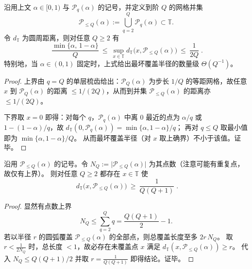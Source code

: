 \begin{proposition}\label{prop:zeta-cyclic-lift-addressable-grid-covering-radius}
沿用上文 \(\alpha\in[0,1)\) 与 \(\mathcal P_q(\alpha)\) 的记号，并定义到阶 \(Q\) 的网格并集
\[
\mathcal P_{\le Q}(\alpha):=\bigcup_{q=2}^{Q}\mathcal P_q(\alpha)\subset\mathbb T .
\]
令 \(d_{\mathbb T}\) 为圆周距离，则对任意 \(Q\ge 2\) 有
\[
\boxed{\;
\frac{\min\{\alpha,\,1-\alpha\}}{Q}
\ \le\
\sup_{x\in\mathbb T} d_{\mathbb T}\bigl(x,\mathcal P_{\le Q}(\alpha)\bigr)
\ \le\
\frac{1}{2Q}\; }.
\]
特别地，当 \(\alpha\in(0,1)\) 固定时，上式给出最坏覆盖半径的数量级 \(\Theta(Q^{-1})\)。
\end{proposition}
\begin{proof}
上界由 \(q=Q\) 的单层梳齿给出：\(\mathcal P_Q(\alpha)\) 为步长 \(1/Q\) 的等距网格，故任意 \(x\) 到 \(\mathcal P_Q(\alpha)\) 的距离 \(\le 1/(2Q)\)，从而到并集 \(\mathcal P_{\le Q}(\alpha)\) 的距离亦 \(\le 1/(2Q)\)。
\par
下界取 \(x=0\) 即得：对每个 \(q\)，\(\mathcal P_q(\alpha)\) 中离 \(0\) 最近的点为 \(\alpha/q\) 或 \(1-(1-\alpha)/q\)，故
\(
d_{\mathbb T}(0,\mathcal P_q(\alpha))=\min\{\alpha,1-\alpha\}/q
\)；
再对 \(q\le Q\) 取最小值即为 \(\min\{\alpha,1-\alpha\}/Q\)。
从而最坏覆盖半径（对 \(x\) 取上确界）不小于该值。证毕。
\end{proof}

\begin{proposition}\label{prop:zeta-cyclic-lift-covering-radius-counting-lb}
沿用 \(\mathcal P_{\le Q}(\alpha)\) 的记号。令
\(
N_Q:=\bigl|\mathcal P_{\le Q}(\alpha)\bigr|
\)
为其点数（注意可能有重复点，故仅有上界）。
则对任意 \(Q\ge 2\) 都存在 \(x\in\mathbb T\) 使
\[
\boxed{\;
d_{\mathbb T}\bigl(x,\mathcal P_{\le Q}(\alpha)\bigr)\ \ge\ \frac{1}{Q(Q+1)}\; }.
\]
\end{proposition}
\begin{proof}
显然有点数上界
\[
N_Q\le \sum_{q=2}^{Q} q=\frac{Q(Q+1)}{2}-1.
\]
若以半径 \(r\) 的圆弧覆盖 \(\mathcal P_{\le Q}(\alpha)\) 的全部点，则总覆盖长度至多 \(2r\,N_Q\)。
取 \(r<\frac{1}{2N_Q}\) 时，总长度 \(<1\)，故必存在未覆盖点 \(x\) 满足
\(
d_{\mathbb T}(x,\mathcal P_{\le Q}(\alpha))\ge r
\)。
代入 \(N_Q\le Q(Q+1)/2\) 并取 \(r=\frac{1}{Q(Q+1)}\) 即得结论。证毕。
\end{proof}

